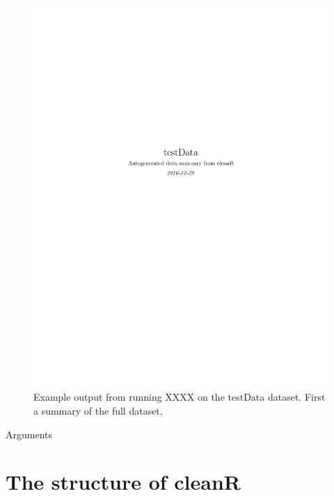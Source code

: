 \documentclass[article]{jss}
\begin{document}
\begin{figure}[!htp]
\begin{center}
\includegraphics[page=2]{cleanR_testData.pdf}
%
\end{center}
\label{fig:example1}
\caption{Example output from running XXXX on the testData
  dataset. First a summary of the full dataset, }
\end{figure}

Arguments


\section{The structure of cleanR} \label{sec:internals}
\end{document}
